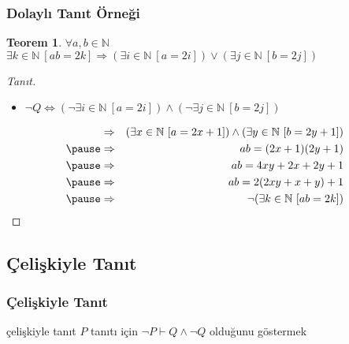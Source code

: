 \documentclass[dvipsnames]{beamer}
\theoremstyle{definition}
\theoremstyle{example}
\theoremstyle{plain}
\newtheorem{teorem}[theorem]{Teorem}
\begin{document}
\begin{frame}
  \frametitle{Dolaylı Tanıt Örneği}

  \begin{teorem}
    $\forall a,b \in \mathbb{N}$\\
      $\exists k \in \mathbb{N}~[ab=2k] \Rightarrow
        (\exists i \in \mathbb{N}~[a=2i]) \vee
        (\exists j \in \mathbb{N}~[b=2j])$
  \end{teorem}

  \pause
  \begin{proof}[Tanıt]
    \begin{itemize}
      \item $\neg Q \Leftrightarrow (\neg \exists i \in \mathbb{N}~[a=2i])
                          \wedge (\neg \exists j \in \mathbb{N}~[b=2j])$
    \end{itemize}

    \pause
    \vspace{-24pt}
    \begin{eqnarray*}
      & \Rightarrow & (\exists x \in \mathbb{N}~[a=2x+1])
               \wedge (\exists y \in \mathbb{N}~[b=2y+1])\\\pause
      & \Rightarrow & ab=(2x+1)(2y+1)\\\pause
      & \Rightarrow & ab=4xy+2x+2y+1\\\pause
      & \Rightarrow & ab=2(2xy+x+y)+1\\\pause
      & \Rightarrow & \neg (\exists k \in \mathbb{N}~[ab=2k])
    \end{eqnarray*}
  \end{proof}
\end{frame}

\subsection{Çelişkiyle Tanıt}

\begin{frame}
  \frametitle{Çelişkiyle Tanıt}

  \begin{block}{çelişkiyle tanıt}
    $P$ tanıtı için $\neg P \vdash Q \wedge \neg Q$ olduğunu göstermek
  \end{block}
\end{frame}
\end{document}
